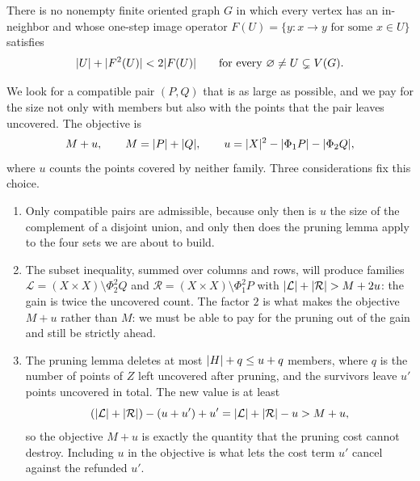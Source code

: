 \begin{proposition}\label{prop:no-concavity}
There is no nonempty finite oriented graph $G$ in which every vertex has an in-neighbor and whose
one-step image operator $F(U)=\{y: x\to y\text{ for some }x\in U\}$ satisfies
\begin{equation}\label{eq:impossible}
 \lvert U\rvert+\lvert F^2(U)\rvert<2\lvert F(U)\rvert
 \qquad\text{for every }\varnothing\ne U\subsetneq V(G).
\end{equation}
\end{proposition}


\begin{ideabox}[title={The design of the extremal objective}]
We look for a compatible pair $(P,Q)$ that is as large as possible, and we pay for the size not only
with members but also with the points that the pair leaves uncovered. The objective is
\[
 M+u,\qquad M=\lvert P\rvert+\lvert Q\rvert,\qquad u=\lvert X\rvert^2-\lvert \Phi_1P\rvert-\lvert \Phi_2Q\rvert,
\]
where $u$ counts the points covered by neither family. Three considerations fix this choice.
\begin{enumerate}[leftmargin=1.3em,itemsep=2pt,topsep=1pt]
\item Only compatible pairs are admissible, because only then is $u$ the size of the complement of a
  disjoint union, and only then does the pruning lemma apply to the four sets we are about to build.
\item The subset inequality, summed over columns and rows, will produce families
  $\mathcal L=(X\times X)\setminus\Phi_2^2Q$ and $\mathcal R=(X\times X)\setminus\Phi_1^2P$ with
  $\lvert \mathcal L\rvert+\lvert \mathcal R\rvert>M+2u$: the gain is twice the uncovered count. The factor $2$ is
  what makes the objective $M+u$ rather than $M$: we must be able to pay for the pruning out of the
  gain and still be strictly ahead.
\item The pruning lemma deletes at most $\lvert H\rvert+q\le u+q$ members, where $q$ is the number of points
  of $Z$ left uncovered after pruning, and the survivors leave $u'$ points uncovered in total. The
  new value is at least
  \[
   (\lvert \mathcal L\rvert+\lvert \mathcal R\rvert)-(u+u')+u'=\lvert \mathcal L\rvert+\lvert \mathcal R\rvert-u>M+u,
  \]
  so the objective $M+u$ is exactly the quantity that the pruning cost cannot destroy. Including $u$
  in the objective is what lets the cost term $u'$ cancel against the refunded $u'$.
\end{enumerate}
\end{ideabox}

